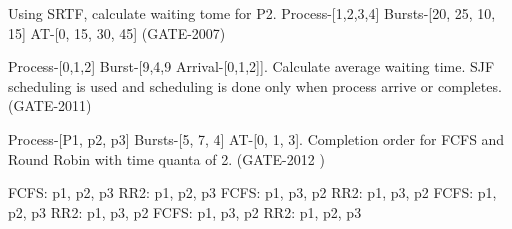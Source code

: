 
\begin{questyle}

  \question Using SRTF, calculate waiting tome for P2.
            Process-[1,2,3,4] Bursts-[20, 25, 10, 15] AT-[0, 15, 30, 45] (GATE-2007)

  \begin{oneparchoices}
  \end{oneparchoices}

  \end{questyle}




\begin{questyle}

  \question  Process-[0,1,2] Burst-[9,4,9 Arrival-[0,1,2]]. Calculate average waiting time.
             SJF scheduling is used and scheduling is done only when process arrive or completes. (GATE-2011)

  \begin{oneparchoices}
  \end{oneparchoices}

\end{questyle}




\begin{questyle}

  \question Process-[P1, p2, p3] Bursts-[5, 7, 4] AT-[0, 1, 3].
            Completion order for FCFS and Round Robin with time quanta of 2. (GATE-2012 )

  \begin{choices}
    \choice FCFS: p1, p2, p3  \qquad   RR2: p1, p2, p3
    \choice FCFS: p1, p3, p2  \qquad   RR2: p1, p3, p2
    \choice FCFS: p1, p2, p3  \qquad   RR2: p1, p3, p2
    \choice FCFS: p1, p3, p2  \qquad   RR2: p1, p2, p3
  \end{choices}

  \end{questyle}




